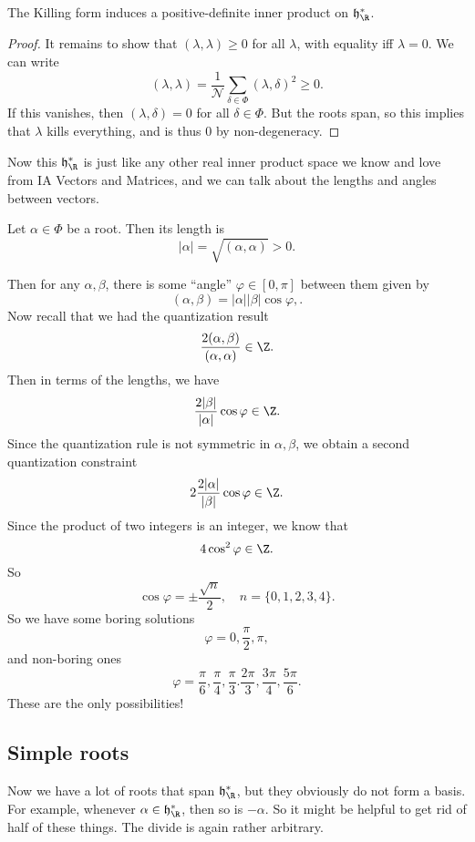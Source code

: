 \documentclass[a4paper]{article}
\begin{document}
\begin{prop}
  The Killing form induces a positive-definite inner product on $\mathfrak{h}_\R^*$.
\end{prop}

\begin{proof}
  It remains to show that $(\lambda, \lambda) \geq 0$ for all $\lambda$, with equality iff $\lambda = 0$. We can write
  \[
    (\lambda, \lambda) = \frac{1}{\mathcal{N}} \sum_{\delta \in \Phi}(\lambda, \delta)^2 \geq 0.
  \]
  If this vanishes, then $(\lambda, \delta) = 0$ for all $\delta \in \Phi$. But the roots span, so this implies that $\lambda$ kills everything, and is thus $0$ by non-degeneracy.
\end{proof}

Now this $\mathfrak{h}_\R^*$ is just like any other real inner product space we know and love from IA Vectors and Matrices, and we can talk about the lengths and angles between vectors.

\begin{defi}
  Let $\alpha \in \Phi$ be a root. Then its length is
  \[
    |\alpha| = \sqrt{(\alpha, \alpha)} > 0.
  \]
\end{defi}

Then for any $\alpha, \beta$, there is some ``angle'' $\varphi \in [0, \pi]$ between them given by
\[
  (\alpha, \beta) = |\alpha||\beta| \cos \varphi,.
\]
Now recall that we had the quantization result
\[
  \frac{2(\alpha, \beta)}{(\alpha, \alpha)} \in \Z.
\]
Then in terms of the lengths, we have
\[
  \frac{2 |\beta|}{|\alpha|} \cos \varphi \in \Z.
\]
Since the quantization rule is not symmetric in $\alpha, \beta$, we obtain a second quantization constraint
\[
  2\frac{2|\alpha|}{|\beta|} \cos \varphi \in \Z.
\]
Since the product of two integers is an integer, we know that
\[
  4 \cos^2 \varphi \in \Z.
\]
So
\[
  \cos \varphi = \pm \frac{\sqrt{n}}{2}, \quad n = \{0, 1, 2, 3, 4\}.
\]
So we have some boring solutions
\[
  \varphi = 0, \frac{\pi}{2}, \pi,
\]
and non-boring ones
\[
  \varphi = \frac{\pi}{6}, \frac{\pi}{4}, \frac{\pi}{3}. \frac{2\pi}{3}, \frac{3 \pi}{4}, \frac{5 \pi}{6}.
\]
These are the only possibilities!

\subsection{Simple roots}
Now we have a lot of roots that span $\mathfrak{h}^*_\R$, but they obviously do not form a basis. For example, whenever $\alpha \in \mathfrak{h}^*_\R$, then so is $-\alpha$. So it might be helpful to get rid of half of these things. The divide is again rather arbitrary.
\end{document}
